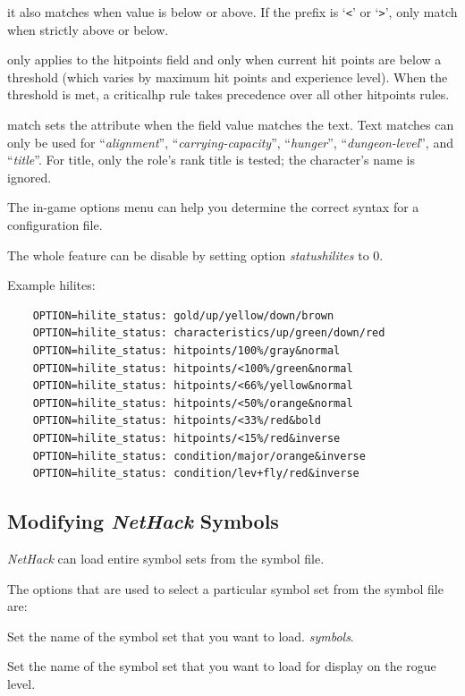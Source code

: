 \documentclass[titlepage]{article}
\begin{document}
\begin{description}[font=\mdseries\ttfamily]
it also matches when value is below or above.
If the prefix is `\texttt{<}' or `\texttt{>}', only match when strictly
above or below.
\item[criticalhp] only applies to the hitpoints field and only
when current hit points are below a threshold (which varies by maximum
hit points and experience level).
When the threshold is met, a criticalhp rule takes precedence over all
other hitpoints rules.
\item[text] match sets the attribute when the field value
matches the text.
Text matches can only be used for ``\textit{alignment}'',
``\textit{carrying-capacity}'', ``\textit{hunger}'', ``\textit{dungeon-level}'',
and ``\textit{title}''.
For title, only the role's rank title
is tested; the character's name is ignored.
\end{description}

The in-game options menu can help you determine the correct syntax for a
configuration file.

The whole feature can be disable by setting option \textit{statushilites} to 0.

Example hilites:
\begin{verbatim}
    OPTION=hilite_status: gold/up/yellow/down/brown
    OPTION=hilite_status: characteristics/up/green/down/red
    OPTION=hilite_status: hitpoints/100%/gray&normal
    OPTION=hilite_status: hitpoints/<100%/green&normal
    OPTION=hilite_status: hitpoints/<66%/yellow&normal
    OPTION=hilite_status: hitpoints/<50%/orange&normal
    OPTION=hilite_status: hitpoints/<33%/red&bold
    OPTION=hilite_status: hitpoints/<15%/red&inverse
    OPTION=hilite_status: condition/major/orange&inverse
    OPTION=hilite_status: condition/lev+fly/red&inverse
\end{verbatim}

\subsection*{Modifying \textit{NetHack} Symbols}

\textit{NetHack} can load entire symbol sets from the symbol file.

The options that are used to select a particular symbol set from the
symbol file are:

\begin{description}[font=\mdseries\itshape]
\item[symset]
Set the name of the symbol set that you want to load.
\textit{symbols}.

\item[roguesymset]
Set the name of the symbol set that you want to load for display
on the rogue level.
\end{description}
\end{document}
